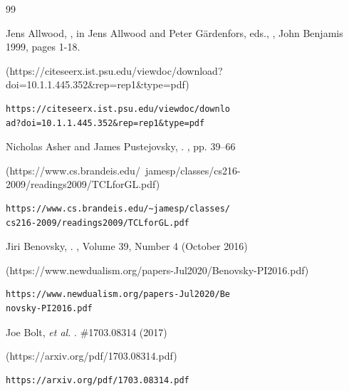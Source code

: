 
\let\oldbibitem\bibitem
\def\bibitem{\oldbibitem}


\vspace{2em}

\begin{thebibliography}{99}

\setlength{\parskip}{0pt}
\setlength{\itemsep}{0pt plus 0.3ex}



{\fontsize{9}{10}\selectfont


Jens Allwood, , in 
Jens Allwood and Peter G\"ardenfors, eds.,
, 
John Benjamis 1999, pages 1-18.
%
\begin{boxurl}(https://citeseerx.ist.psu.edu/viewdoc/download?doi=10.1.1.445.352&rep=rep1&type=pdf)
\begin{lstlisting}
https://citeseerx.ist.psu.edu/viewdoc/downlo
ad?doi=10.1.1.445.352&rep=rep1&type=pdf
\end{lstlisting}
\end{boxurl}





Nicholas Asher and James Pustejovsky, 
.
, pp. 39--66
%
\begin{boxurl}(https://www.cs.brandeis.edu/~jamesp/classes/cs216-2009/readings2009/TCLforGL.pdf)
\begin{lstlisting}
https://www.cs.brandeis.edu/~jamesp/classes/
cs216-2009/readings2009/TCLforGL.pdf
\end{lstlisting}
\end{boxurl}



Jiri Benovsky,  
.
,
Volume 39, Number 4 (October 2016) 
%
\begin{boxurl}(https://www.newdualism.org/papers-Jul2020/Benovsky-PI2016.pdf)
\begin{lstlisting}
https://www.newdualism.org/papers-Jul2020/Be
novsky-PI2016.pdf
\end{lstlisting}
\end{boxurl}





Joe Bolt, \textit{et al.} 
.
 \#1703.08314 (2017)
%
\begin{boxurl}(https://arxiv.org/pdf/1703.08314.pdf)
\begin{lstlisting}
https://arxiv.org/pdf/1703.08314.pdf
\end{lstlisting}
\end{boxurl}



}
\end{thebibliography}
